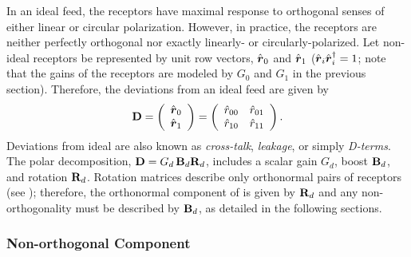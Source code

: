 In an ideal feed, the receptors have maximal response to orthogonal senses of either linear or circular polarization.
%
However, in practice, the receptors are neither perfectly orthogonal nor exactly linearly- or circularly-polarized.
%
Let non-ideal receptors be represented by unit row vectors, $\hat{\mbox{\boldmath $r$}}_0$ and $\hat{\mbox{\boldmath $r$}}_1$ ($\hat{\mbox{\boldmath $r$}}_i \hat{\mbox{\boldmath $r$}}_i^\dagger = 1$; note that the gains of the receptors are modeled by $G_0$ and $G_1$ in the previous section).
%
Therefore, the deviations from an ideal feed are given by
%
\begin{equation}
        \label{eqn:nonorthogonal_Jones}
        {\bf D} =
        \left( \begin{array}{c}
                \hat{\mbox{\boldmath $r$}}_0 \\
                \hat{\mbox{\boldmath $r$}}_1
        \end{array} \right)
        =
	\left( \begin{array}{cc}
		\hat{r}_{00} & \hat{r}_{01} \\
		\hat{r}_{10} & \hat{r}_{11}
	\end{array} \right).
\end{equation}
%
Deviations from ideal are also known as \emph{cross-talk}, \emph{leakage}, or simply \emph{D-terms}.
%
The polar decomposition, ${\bf D} = G_d \, {\bf B}_d {\bf R}_d$, includes a scalar gain $G_d$, boost ${\bf B}_d$, and rotation ${\bf R}_d$.
%
%
Rotation matrices describe only orthonormal pairs of receptors (see ); therefore,
%
the orthonormal component of  is given by ${\bf R}_d$ and
any non-orthogonality must be described by ${\bf B}_d$,
as detailed in the following sections.


\subsubsection{Non-orthogonal Component}
\label{sec:nonorthogonality}

